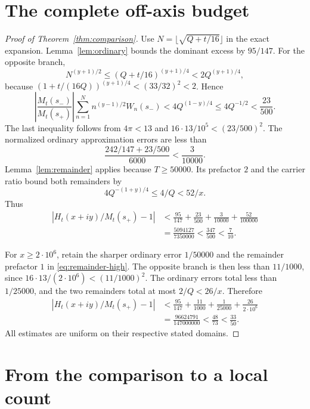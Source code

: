 \documentclass[11pt]{article}
\theoremstyle{remark}
\newcommand{\abs}[1]{\left\lvert#1\right\rvert}
\numberwithin{equation}{section}
\begin{document}
\section{The complete off-axis budget}\label{sec:budget}

\begin{proof}[Proof of Theorem~\ref{thm:comparison}]
Use $N=\lfloor\sqrt{Q+t/16}\rfloor$ in the exact expansion.
Lemma~\ref{lem:ordinary} bounds the dominant excess by $95/147$.
For the opposite branch,
\[
 N^{(y+1)/2}\le(Q+t/16)^{(y+1)/4}<2Q^{(y+1)/4},
\]
because $(1+t/(16Q))^{(y+1)/4}<(33/32)^2<2$. Hence
\begin{equation}\label{eq:opposite}
 \abs{\frac{M_t(s_-)}{M_t(s_+)}}
 \sum_{n=1}^N n^{(y-1)/2}W_n(s_-)
 <4Q^{(1-y)/4}\le4Q^{-1/2}<\frac{23}{500}.
\end{equation}
The last inequality follows from $4\pi<13$ and
$16\cdot13/10^5<(23/500)^2$.
The normalized ordinary approximation errors are less than
\[
 \frac{242/147+23/500}{6000}<\frac3{10000}.
\]
Lemma~\ref{lem:remainder} applies because $T\ge50000$. Its prefactor
$2$ and the carrier ratio bound both remainders by
\[
 4Q^{-(1+y)/4}\le4/Q<52/x.
\]
Thus
\begin{align*}
 \abs{H_t(x+iy)/M_t(s_+)-1}
 &<\frac{95}{147}+\frac{23}{500}+\frac3{10000}+\frac{52}{100000}\\
 &=\frac{5094127}{7350000}<\frac{347}{500}<\frac7{10}.
\end{align*}

For $x\ge2\cdot10^6$, retain the sharper ordinary error $1/50000$
and the remainder prefactor $1$ in \eqref{eq:remainder-high}.
The opposite branch is then less than $11/1000$, since
$16\cdot13/(2\cdot10^6)<(11/1000)^2$.
The ordinary errors total less than $1/25000$, and the two remainders
total at most $2/Q<26/x$. Therefore
\begin{align*}
 \abs{H_t(x+iy)/M_t(s_+)-1}
 &<\frac{95}{147}+\frac{11}{1000}+\frac1{25000}+\frac{26}{2\cdot10^6}\\
 &=\frac{96624791}{147000000}<\frac{48}{73}<\frac{33}{50}.
\end{align*}
All estimates are uniform on their respective stated domains.
\end{proof}

\section{From the comparison to a local count}\label{sec:count}
\end{document}
